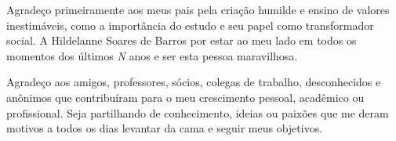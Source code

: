 \begin{agradecimentos}
	Agradeço primeiramente aos meus pais pela criação humilde e ensino de valores inestimáveis, como a importância do estudo e seu papel como transformador social. A Hildelanne Soares de Barros por estar ao meu lado em todos os momentos dos últimos \emph{N} anos e ser esta pessoa maravilhosa.
    
    Agradeço aos amigos, professores, sócios, colegas de trabalho, desconhecidos e anônimos que contribuíram para o meu crescimento pessoal, acadêmico ou profissional. Seja partilhando de conhecimento, ideias ou paixões que me deram motivos a todos os dias levantar da cama e seguir meus objetivos.
    
\end{agradecimentos}